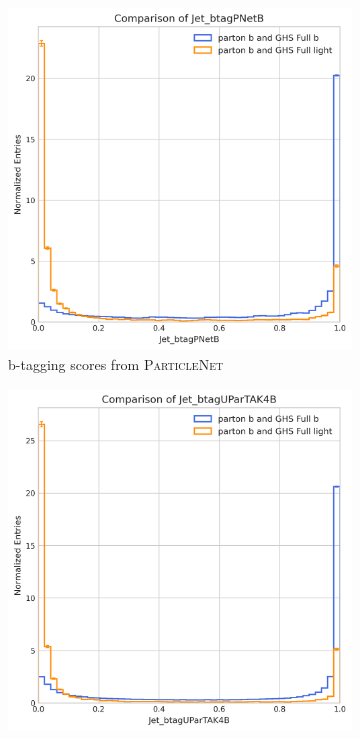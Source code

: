 \documentclass[10pt,twocolumn]{article}
\begin{document}
\begin{figure}[!htbp]
    \centering
    \begin{subfigure}[t]{0.48\textwidth}
        \centering
        \includegraphics[width=\textwidth]{images/compare_btagPNetB_GHSFull_light_vs_b_filter_partonFlavour_5.png}
        \caption{b-tagging scores from \textsc{ParticleNet}}
        \label{fig:jet_btagPNet_full_b_parton_b}
    \end{subfigure}
    \hfill
    \begin{subfigure}[t]{0.48\textwidth}
        \centering
        \includegraphics[width=\textwidth]{images/compare_btagUParTAK4B_GHSFull_light_vs_b_filter_partonFlavour_5.png}

\end{subfigure}
\end{figure}
\end{document}
